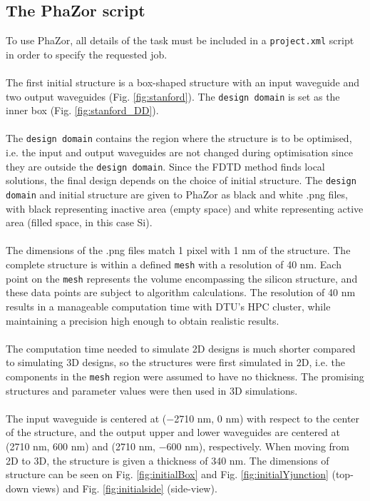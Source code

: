 \subsection{The PhaZor script}

To use PhaZor, all details of the task must be included in a \texttt{project.xml} script in order to specify the requested job. \\
\\
The first initial structure is a box-shaped structure with an input waveguide and two output waveguides (Fig.  \ref{fig:stanford}). The \texttt{design domain} is set as the inner box (Fig. \ref{fig:stanford_DD}). \\
\\
The \texttt{design domain} contains the region where the structure is to be optimised, i.e. the input and output waveguides are not changed during optimisation since they are outside the \texttt{design domain}. Since the FDTD method finds local solutions, the final design depends on the choice of initial structure. The \texttt{design domain} and initial structure are given to PhaZor as black and white .png files, with black representing inactive area (empty space) and white representing active area (filled space, in this case Si).\\
\\
The dimensions of the .png files match 1 pixel with 1 nm of the structure. The complete structure is within a defined \texttt{mesh} with a resolution of 40 nm. Each point on the \texttt{mesh} represents the volume encompassing the silicon structure, and these data points are subject to algorithm calculations. The resolution of 40 nm results in a manageable computation time with DTU's HPC cluster, while maintaining a precision high enough to obtain realistic results.\\
\\
The computation time needed to simulate 2D designs is much shorter compared to simulating 3D designs, so the structures were first simulated in 2D, i.e. the components in the \texttt{mesh} region were assumed to have no thickness. The promising structures and parameter values were then used in 3D simulations.\\
\\
The input waveguide is centered at ($-$2710 nm, 0 nm) with respect to the center of the structure, and the output upper and lower waveguides are centered at (2710 nm, 600 nm) and (2710 nm, $-$600 nm), respectively. When moving from 2D to 3D, the structure is given a thickness of 340 nm. The dimensions of structure can be seen on Fig. \ref{fig:initialBox} and Fig. \ref{fig:initialYjunction} (top-down views) and Fig. \ref{fig:initialside} (side-view).\\
